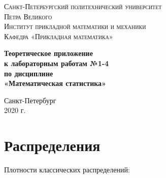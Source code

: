 \documentclass{article}
\begin{document}
\begin{titlepage}
\begin{center}
\textsc{Санкт-Петербургский политехнический университет\\Петра Великого\\[5mm]
Институт прикладной математики и механики\\[2mm]
Кафедра «Прикладная математика»}

\vfill

\textbf{Теоретическое приложение\\к лабораторным работам №1-4\\по дисциплине\\ «Математическая статистика»
\\[26mm]
}
\end{center}


\vspace*{\fill}
\begin{center}
 Санкт-Петербург\\2020 г.
\end{center}
\end{titlepage}
\newpage

\tableofcontents
\newpage

\listoffigures
\newpage

\listoftables
\newpage
 

\section{Распределения}
Плотности классических распределений:
\end{document}
